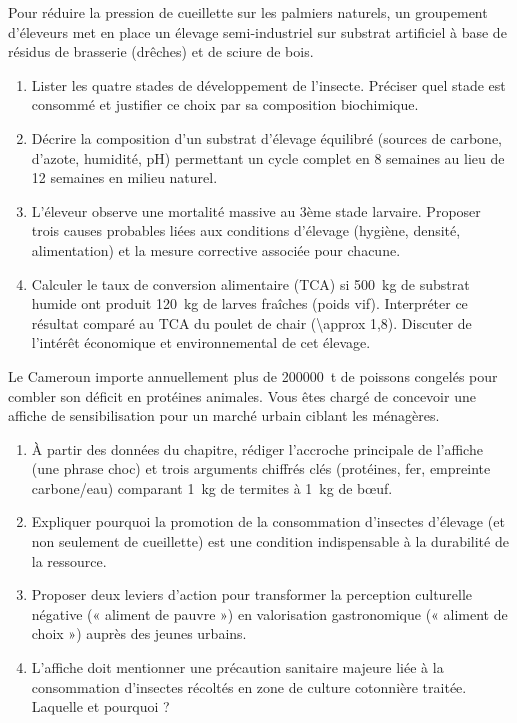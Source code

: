 \documentclass[11pt]{article}
\begin{document}
\begin{exercice}
Pour réduire la pression de cueillette sur les palmiers naturels, un groupement d'éleveurs met en place un élevage semi-industriel sur substrat artificiel à base de résidus de brasserie (drêches) et de sciure de bois.

\begin{enumerate}
\item Lister les quatre stades de développement de l'insecte. Préciser quel stade est consommé et justifier ce choix par sa composition biochimique.
\item Décrire la composition d'un substrat d'élevage équilibré (sources de carbone, d'azote, humidité, pH) permettant un cycle complet en 8 semaines au lieu de 12 semaines en milieu naturel.
\item L'éleveur observe une mortalité massive au 3ème stade larvaire. Proposer trois causes probables liées aux conditions d'élevage (hygiène, densité, alimentation) et la mesure corrective associée pour chacune.
\item Calculer le taux de conversion alimentaire (TCA) si \SI{500}{\kilo\gram} de substrat humide ont produit \SI{120}{\kilo\gram} de larves fraîches (poids vif). Interpréter ce résultat comparé au TCA du poulet de chair (\SI{\approx 1,8}{}). Discuter de l'intérêt économique et environnemental de cet élevage.
\end{enumerate}
\end{exercice}

\begin{exercice}
Le Cameroun importe annuellement plus de \SI{200000}{\tonne} de poissons congelés pour combler son déficit en protéines animales. Vous êtes chargé de concevoir une affiche de sensibilisation pour un marché urbain ciblant les ménagères.

\begin{enumerate}
\item À partir des données du chapitre, rédiger l'accroche principale de l'affiche (une phrase choc) et trois arguments chiffrés clés (protéines, fer, empreinte carbone/eau) comparant \SI{1}{\kilo\gram} de termites à \SI{1}{\kilo\gram} de bœuf.
\item Expliquer pourquoi la promotion de la consommation d'insectes d'élevage (et non seulement de cueillette) est une condition indispensable à la durabilité de la ressource.
\item Proposer deux leviers d'action pour transformer la perception culturelle négative (« aliment de pauvre ») en valorisation gastronomique (« aliment de choix ») auprès des jeunes urbains.
\item L'affiche doit mentionner une précaution sanitaire majeure liée à la consommation d'insectes récoltés en zone de culture cotonnière traitée. Laquelle et pourquoi ?
\end{enumerate}
\end{exercice}
\end{document}
